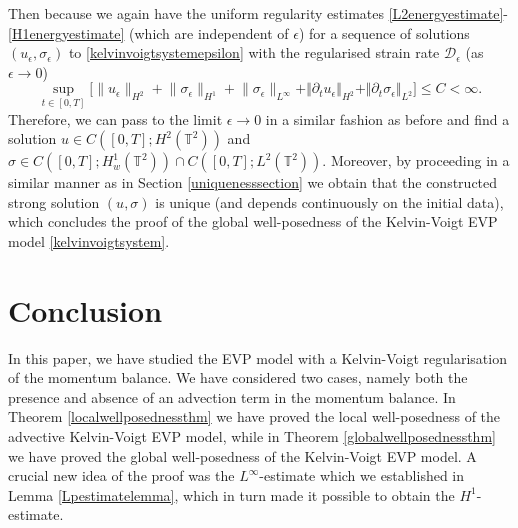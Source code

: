 \documentclass[12pt,a4paper]{article}
\theoremstyle{definition}
\theoremstyle{remark}
\numberwithin{equation}{section}
\begin{document}
Then because we again have the uniform regularity estimates \eqref{L2energyestimate}-\eqref{H1energyestimate} (which are independent of $\epsilon$) for a sequence of solutions $(u_\epsilon ,\sigma_\epsilon )$ to \eqref{kelvinvoigtsystemepsilon} with the regularised strain rate $\mathcal{D}_\epsilon$ (as $\epsilon \rightarrow 0$)
\begin{equation}
\sup_{t \in [0,T]} \biggl\lbrack \lVert u_\epsilon \rVert_{H^2} + \lVert \sigma_\epsilon \rVert_{H^1} + \lVert \sigma_\epsilon \rVert_{L^\infty} + \Vert \partial_t u_\epsilon \Vert_{H^2} + \Vert \partial_t\sigma_\epsilon \Vert_{L^2} \biggr\rbrack \leq C < \infty.
\end{equation}
Therefore, we can pass to the limit $\epsilon \rightarrow 0$ in a similar fashion as before and find a solution $u \in C([0,T];H^2 (\mathbb{T}^2))$ and $\sigma \in C([0,T];H^1_w (\mathbb{T}^2)) \cap C([0,T]; L^2 (\mathbb{T}^2))$. Moreover, by proceeding in a similar manner as in Section \ref{uniquenesssection} we obtain that the constructed strong solution $(u,\sigma)$ is unique (and depends continuously on the initial data), which concludes the proof of the global well-posedness of the Kelvin-Voigt EVP model \eqref{kelvinvoigtsystem}.

\section{Conclusion}
In this paper, we have studied the EVP model with a Kelvin-Voigt regularisation of the momentum balance. We have considered two cases, namely both the presence and absence of an advection term in the momentum balance. In Theorem \ref{localwellposednessthm} we have proved the local well-posedness of the advective Kelvin-Voigt EVP model, while in Theorem \ref{globalwellposednessthm} we have proved the global well-posedness of the Kelvin-Voigt EVP model. A crucial new idea of the proof was the $L^\infty$-estimate which we established in Lemma \ref{Lpestimatelemma}, which in turn made it possible to obtain the $H^1$-estimate. 
\end{document}
